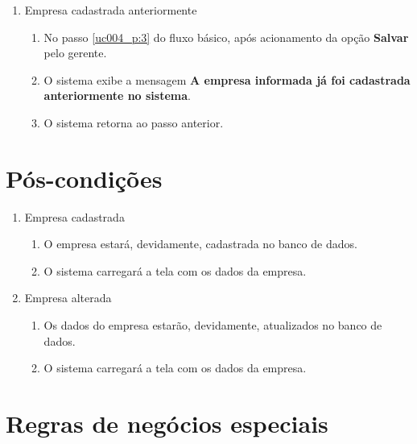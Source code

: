 \begin{enumerate}[label=E\arabic*]
	\item Empresa cadastrada anteriormente \label{uc004_e:8}
	\begin{enumerate}[label*=.\arabic*]
		\item[] No passo \ref{uc004_p:3} do fluxo básico, após acionamento da opção \textbf{Salvar} pelo gerente.
		\item O sistema exibe a mensagem \textbf{A empresa informada já foi cadastrada anteriormente no sistema}.
		\item O sistema retorna ao passo anterior.
	\end{enumerate}
\end{enumerate}

\section{Pós-condições}

\begin{enumerate}
	\item Empresa cadastrada
	\begin{enumerate}
		\item O empresa estará, devidamente, cadastrada no banco de dados.
		\item O sistema carregará a tela com os dados da empresa.
	\end{enumerate}
	
	\item Empresa alterada
	\begin{enumerate}
		\item Os dados do empresa estarão, devidamente, atualizados no banco de dados.
		\item O sistema carregará a tela com os dados da empresa.
	\end{enumerate}
\end{enumerate}

\section{Regras de negócios especiais}

